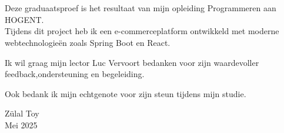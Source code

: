 
\chapter*{}%
\label{ch:voorwoord}


Deze graduaatsproef is het resultaat van mijn opleiding Programmeren aan HOGENT.  \\
Tijdens dit project heb ik een e-commerceplatform ontwikkeld met moderne webtechnologieën zoals Spring Boot en React.

Ik wil graag mijn lector Luc Vervoort bedanken voor zijn waardevoller feedback,ondersteuning en begeleiding.

Ook bedank ik mijn echtgenote voor zijn steun tijdens mijn studie.

Zülal Toy\\
Mei 2025